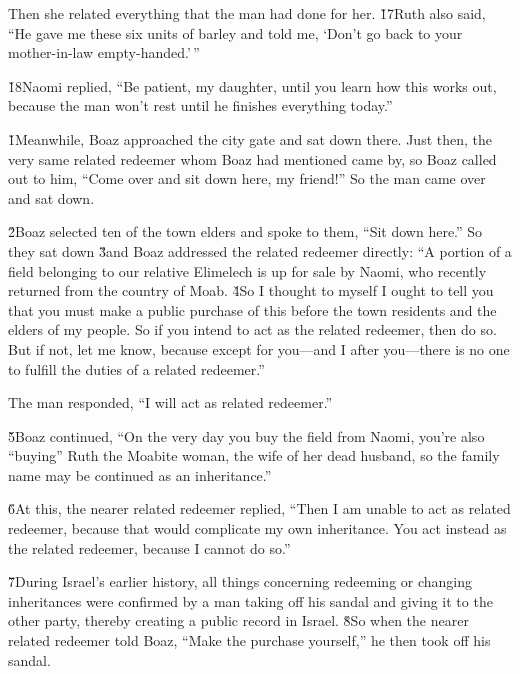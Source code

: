 Then she related everything that the man had done for her. \v{17}Ruth also said, ``He gave me these six units of barley and told me, `Don't go back to your mother-in-law empty-handed.'\,''

\v{18}Naomi replied, ``Be patient, my daughter, until you learn how this works out, because the man won't rest until he finishes everything today.''

\v{1}Meanwhile, Boaz approached the city gate and sat down there. Just then, the very same related redeemer whom Boaz had mentioned came by, so Boaz called out to him, ``Come over and sit down here, my friend!'' So the man came over and sat down.

\v{2}Boaz selected ten of the town elders and spoke to them, ``Sit down here.'' So they sat down \v{3}and Boaz addressed the related redeemer directly: ``A portion of a field belonging to our relative Elimelech is up for sale by Naomi, who recently returned from the country of Moab. \v{4}So I thought to myself I ought to tell you that you must make a public purchase of this before the town residents and the elders of my people. So if you intend to act as the related redeemer, then do so. But if not, let me know, because except for you---and I after you---there is no one to fulfill the duties of a related redeemer.''

The man responded, ``I will act as related redeemer.''

\v{5}Boaz continued, ``On the very day you buy the field from Naomi, you're also ``buying'' Ruth the Moabite woman, the wife of her dead husband, so the family name may be continued as an inheritance.''

\v{6}At this, the nearer related redeemer replied, ``Then I am unable to act as related redeemer, because that would complicate my own inheritance. You act instead as the related redeemer, because I cannot do so.''

\v{7}During Israel's earlier history, all things concerning redeeming or changing inheritances were confirmed by a man taking off his sandal and giving it to the other party, thereby creating a public record in Israel. \v{8}So when the nearer related redeemer told Boaz, ``Make the purchase yourself,'' he then took off his sandal.

